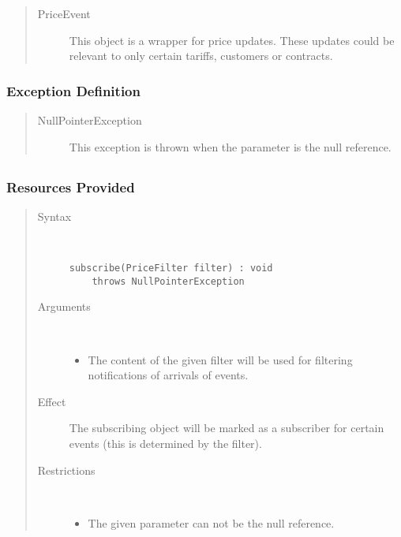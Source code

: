 \begin{quote}
	\begin{description}
		\item[PriceEvent] This object is a wrapper for price updates. These updates
		could be relevant to only certain tariffs, customers or contracts.
	\end{description} 
\end{quote}

\subsubsection{Exception Definition} 

\begin{quote}
	\begin{description}
		\item[NullPointerException] This exception is thrown when the parameter
		is the null reference.
	\end{description} 
\end{quote}

\subsection{}

\subsubsection{Resources Provided}

\begin{quote}
	\begin{description}
		\item[Syntax] \
		\begin{verbatim}
subscribe(PriceFilter filter) : void
    throws NullPointerException
		\end{verbatim}
		\item[Arguments] \
		\begin{itemize}
		  \item The content of the given filter will be used for filtering
		  notifications of arrivals of events.
		\end{itemize}
		\item[Effect] The subscribing object will be marked as a subscriber for
		certain events (this is determined by the filter).
		\item[Restrictions] \
		\begin{itemize}
		  \item The given parameter can not be the null reference.
		\end{itemize}
	\end{description} 
\end{quote}

